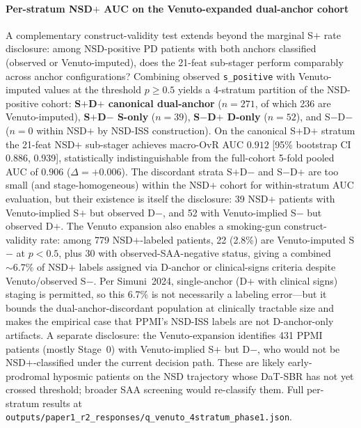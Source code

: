 \documentclass[10pt,letterpaper]{article}
\begin{document}
\paragraph*{Per-stratum NSD$+$ AUC on the Venuto-expanded dual-anchor cohort} A complementary construct-validity test extends beyond the marginal S$+$ rate disclosure: among NSD-positive PD patients with both anchors classified (observed or Venuto-imputed), does the 21-feat sub-stager perform comparably across anchor configurations? Combining observed \texttt{s\_positive} with Venuto-imputed values at the threshold $p{\geq}0.5$ yields a 4-stratum partition of the NSD-positive cohort: \textbf{S$+$D$+$ canonical dual-anchor} ($n{=}271$, of which 236 are Venuto-imputed), \textbf{S$+$D$-$ S-only} ($n{=}39$), \textbf{S$-$D$+$ D-only} ($n{=}52$), and S$-$D$-$ ($n{=}0$ within NSD$+$ by NSD-ISS construction). On the canonical S$+$D$+$ stratum the 21-feat NSD$+$ sub-stager achieves macro-OvR AUC $\mathbf{0.912}$ [95\% bootstrap CI 0.886, 0.939], statistically indistinguishable from the full-cohort 5-fold pooled AUC of $0.906$ ($\Delta{=}{+}0.006$). The discordant strata S$+$D$-$ and S$-$D$+$ are too small (and stage-homogeneous) within the NSD$+$ cohort for within-stratum AUC evaluation, but their existence is itself the disclosure: 39 NSD$+$ patients with Venuto-implied S$+$ but observed D$-$, and 52 with Venuto-implied S$-$ but observed D$+$. The Venuto expansion also enables a smoking-gun construct-validity rate: among 779 NSD$+$-labeled patients, 22 (2.8\%) are Venuto-imputed S$-$ at $p{<}0.5$, plus 30 with observed-SAA-negative status, giving a combined ${\sim}6.7\%$ of NSD$+$ labels assigned via D-anchor or clinical-signs criteria despite Venuto/observed S$-$. Per Simuni~2024, single-anchor (D$+$ with clinical signs) staging is permitted, so this 6.7\% is not necessarily a labeling error---but it bounds the dual-anchor-discordant population at clinically tractable size and makes the empirical case that PPMI's NSD-ISS labels are not D-anchor-only artifacts. A separate disclosure: the Venuto-expansion identifies 431 PPMI patients (mostly Stage~0) with Venuto-implied S$+$ but D$-$, who would not be NSD$+$-classified under the current decision path. These are likely early-prodromal hyposmic patients on the NSD trajectory whose DaT-SBR has not yet crossed threshold; broader SAA screening would re-classify them. Full per-stratum results at \texttt{outputs/paper1\_r2\_responses/q\_venuto\_4stratum\_phase1.json}.
\end{document}
